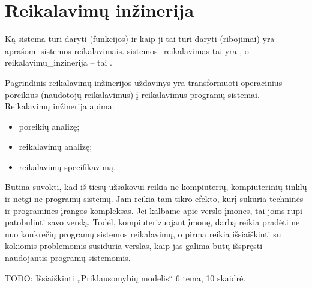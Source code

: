 \chapter{Reikalavimų inžinerija}

Ką sistema turi daryti (funkcijos) ir kaip ji tai turi daryti (ribojimai)
yra aprašomi sistemos reikalavimais. \Gls{sistemos_reikalavimas} tai yra 
, o \gls{reikalavimu_inzinerija} –
tai .

Pagrindinis reikalavimų inžinerijos uždavinys yra transformuoti operacinius
poreikius (naudotojų reikalavimus) į reikalavimus programų sistemai.
Reikalavimų inžinerija apima:
\begin{itemize}
  \item poreikių analizę;
  \item reikalavimų analizę;
  \item reikalavimų specifikavimą.
\end{itemize}

Būtina suvokti, kad iš tiesų užsakovui reikia ne kompiuterių, kompiuterinių
tinklų ir netgi ne programų sistemų. Jam reikia tam tikro efekto, kurį
sukuria techninės ir programinės įrangos kompleksas. Jei kalbame apie
verslo įmones, tai joms rūpi patobulinti savo verslą. Todėl, 
kompiuterizuojant įmonę, darbą reikia pradėti ne nuo konkrečių programų
sistemos reikalavimų, o pirma reikia išsiaiškinti su kokiomis problemomis
susiduria verslas, kaip jas galima būtų išspręsti naudojantis programų 
sistemomis.

TODO: Išsiaiškinti „Priklausomybių modelis“ 6 tema, 10 skaidrė.
